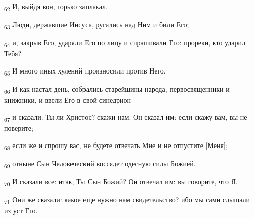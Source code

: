 \begin{tcolorbox}
\textsubscript{62} И, выйдя вон, горько заплакал.
\end{tcolorbox}
\begin{tcolorbox}
\textsubscript{63} Люди, державшие Иисуса, ругались над Ним и били Его;
\end{tcolorbox}
\begin{tcolorbox}
\textsubscript{64} и, закрыв Его, ударяли Его по лицу и спрашивали Его: прореки, кто ударил Тебя?
\end{tcolorbox}
\begin{tcolorbox}
\textsubscript{65} И много иных хулений произносили против Него.
\end{tcolorbox}
\begin{tcolorbox}
\textsubscript{66} И как настал день, собрались старейшины народа, первосвященники и книжники, и ввели Его в свой синедрион
\end{tcolorbox}
\begin{tcolorbox}
\textsubscript{67} и сказали: Ты ли Христос? скажи нам. Он сказал им: если скажу вам, вы не поверите;
\end{tcolorbox}
\begin{tcolorbox}
\textsubscript{68} если же и спрошу вас, не будете отвечать Мне и не отпустите [Меня];
\end{tcolorbox}
\begin{tcolorbox}
\textsubscript{69} отныне Сын Человеческий воссядет одесную силы Божией.
\end{tcolorbox}
\begin{tcolorbox}
\textsubscript{70} И сказали все: итак, Ты Сын Божий? Он отвечал им: вы говорите, что Я.
\end{tcolorbox}
\begin{tcolorbox}
\textsubscript{71} Они же сказали: какое еще нужно нам свидетельство? ибо мы сами слышали из уст Его.
\end{tcolorbox}
